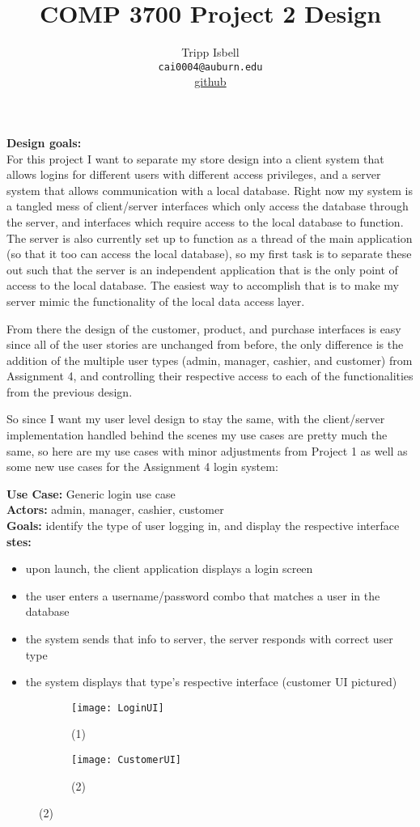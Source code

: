 \documentclass[notitlepage,11pt]{article}
\title{COMP 3700 Project 2 Design}
\author{Tripp Isbell\\
	\texttt{cai0004@auburn.edu}\\
	\href{https://github.com/Carbonationalism/COMP3700}{github}}
\date{}
\begin{document}
\maketitle

\textbf{Design goals:}\\
For this project I want to separate my store design into a client system that allows logins for different users with different access privileges, and a server system that allows communication with a local database. Right now my system is a tangled mess of client/server interfaces which only access the database through the server, and interfaces which require access to the local database to function. The server is also currently set up to function as a thread of the main application (so that it too can access the local database), so my first task is to separate these out such that the server is an independent application that is the only point of access to the local database. The easiest way to accomplish that is to make my server mimic the functionality of the local data access layer. 

From there the design of the customer, product, and purchase interfaces is easy since all of the user stories are unchanged from before, the only difference is the addition of the multiple user types (admin, manager, cashier, and customer) from Assignment 4, and controlling their respective access to each of the functionalities from the previous design.

So since I want my user level design to stay the same, with the client/server implementation handled behind the scenes my use cases are pretty much the same, so here are my use cases with minor adjustments from Project 1 as well as some new use cases for the Assignment 4 login system:


	\textbf{Use Case:} Generic login use case\\
	\textbf{Actors:} admin, manager, cashier, customer\\
	\textbf{Goals:} identify the type of user logging in, and display the respective interface\\
	\textbf{stes:}
	\begin{itemize}
		\item[(1)] upon launch, the client application displays a login screen
		\item the user enters a username/password combo that matches a user in the database
		\item the system sends that info to server, the server responds with correct user type
		\item[(2)] the system displays that type's respective interface (customer UI pictured)
	\end{itemize}
\begin{figure}[h]
	\begin{subfigure}{.5\textwidth}
	\centering
	\texttt{[image: LoginUI]}
	\caption{(1)}
	\end{subfigure}%
	\begin{subfigure}{.5\textwidth}
	\centering
	\texttt{[image: CustomerUI]}
	\caption{(2)}
	\end{subfigure}
\end{figure}
\end{document}

